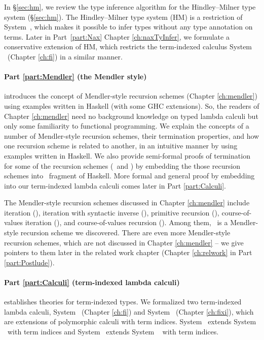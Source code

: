 In \S\ref{sec:hm}, we review the type inference algorithm for
the Hindley--Milner type system (\S\ref{sec:hm}).
The Hindley--Milner type system (HM) is a restriction of System~\F,
which makes it possible to infer types without any type annotation on terms.
Later in Part~\ref{part:Nax} Chapter \ref{ch:naxTyInfer},
we formulate a conservative extension of HM, which restricts
the term-indexed calculus System \Fi\ (Chapter \ref{ch:fi}) in a similar manner.

\paragraph{Part \ref{part:Mendler} (the Mendler style)}\hspace{-1em} introduces
the concept of Mendler-style recursion schemes (Chapter \ref{ch:mendler})
using examples written in Haskell (with some GHC extensions). So, the readers
of Chapter \ref{ch:mendler} need no background knowledge on typed lambda calculi
but only some familiarity to functional programming. We explain the concepts of
a number of Mendler-style recursion schemes, their termination properties, and
how one recursion scheme is related to another, in an intuitive manner by using
examples written in Haskell. We also provide semi-formal proofs of termination
for some of the recursion schemes (\MIt\ and \MsfIt) by embedding the those
recursion schemes into \Fw\ fragment of Haskell. More formal and general
proof by embedding into our term-indexed lambda calculi comes later in
Part \ref{part:Calculi}.

The Mendler-style recursion schemes discussed in Chapter \ref{ch:mendler}
include iteration (\MIt), iteration with syntactic inverse (\MsfIt),
primitive recursion (\MPr), course-of-values iteration (\McvIt),
and course-of-values recursion (\McvPr). Among them, \MsfIt\ is a
Mendler-style recursion scheme we discovered.
There are even more Mendler-style recursion schemes, which are not
discussed in Chapter \ref{ch:mendler} -- we give pointers to them later in
the related work chapter (Chapter \ref{ch:relwork} in Part \ref{part:Postlude}).

\paragraph{Part \ref{part:Calculi} (term-indexed lambda calculi)}\hspace{-1em}
establishes theories for term-indexed types.
We formalized two term-indexed lambda calculi,
System \Fi\ (Chapter \ref{ch:fi}) and System \Fixi\ (Chapter \ref{ch:fixi}),
which are extensions of polymorphic calculi with term indices.
System \Fi\ extends System \Fw\ with term indices and
System \Fixi\ extends System \Fixw\ \cite{AbeMat04} with term indices.

